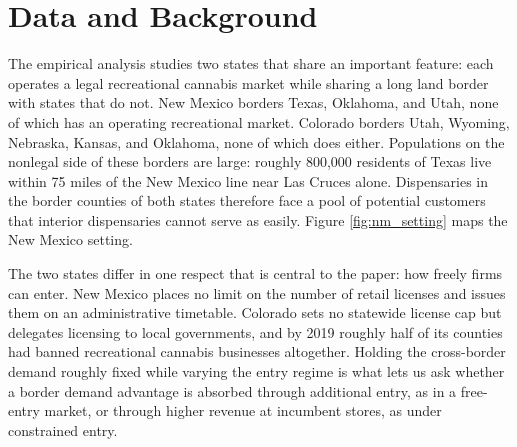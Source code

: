 %
%
%

\section{Data and Background}
\label{sec:data}

The empirical analysis studies two states that share an important feature: each
operates a legal recreational cannabis market while sharing a long land border
with states that do not. New Mexico borders Texas, Oklahoma, and Utah, none of
which has an operating recreational market. Colorado borders Utah, Wyoming,
Nebraska, Kansas, and Oklahoma, none of which does either. Populations on the
nonlegal side of these borders are large: roughly 800,000 residents of Texas
live within 75 miles of the New Mexico line near Las Cruces alone. Dispensaries
in the border counties of both states therefore face a pool of potential
customers that interior dispensaries cannot serve as easily. Figure
\ref{fig:nm_setting} maps the New Mexico setting.

The two states differ in one respect that is central to the paper: how freely
firms can enter. New Mexico places no limit on the number of retail licenses and
issues them on an administrative timetable. Colorado sets no statewide license
cap but delegates licensing to local governments, and by 2019 roughly half of
its counties had banned recreational cannabis businesses altogether. Holding the
cross-border demand roughly fixed while varying the entry regime is what lets us
ask whether a border demand advantage is absorbed through additional entry, as in
a free-entry market, or through higher revenue at incumbent stores, as under
constrained entry.

